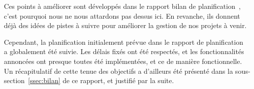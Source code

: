 Ces points à améliorer sont développés dans le rapport bilan de planification~\cite{bilanPlanif}, c'est pourquoi nous ne nous attardons pas dessus ici. En revanche, ils donnent déjà des idées de pistes à suivre pour améliorer la gestion de nos projets à venir.

Cependant, la planification initialement prévue dans le rapport de planification~\cite{planif} a globalement été suivie. Les délais fixés ont été respectés, et les fonctionnalités annoncées ont presque toutes été implémentées, et ce de manière fonctionnelle. Un récapitulatif de cette tenue des objectifs a d'ailleurs été présenté dans la {\sc sous-section}~\ref{ssec:bilan} de ce rapport, et justifié par la suite. 
